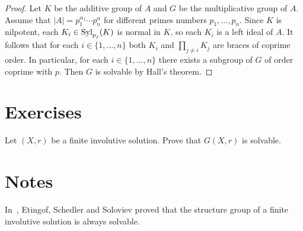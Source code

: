 \begin{proof}
    Let $K$ be the additive group of $A$ and $G$ be the multiplicative group of $A$. Assume
    that $|A|=p_1^{\alpha_1}\cdots p_n^{\alpha}$ for different primes numbers $p_1,\dots,p_n$. 
    Since $K$ is nilpotent, each $K_i\in\mathrm{Syl}_{p_j}(K)$ is normal in $K$, so 
    each $K_i$ is a left ideal of $A$. It follows that for each $i\in\{1,\dots,n\}$ both $K_i$ and 
    $\prod_{j\ne i}K_j$ are braces of coprime order. In particular, for 
    each $i\in\{1,\dots,n\}$ there exists a subgroup of $G$ of order coprime with $p$. 
    Then $G$ is solvable by Hall's theorem. 
\end{proof}








\section*{Exercises}

\begin{prob}
\label{prob:G(X,r)solvable}
Let $(X,r)$ be a finite involutive solution. Prove that $G(X,r)$ is solvable. 
\end{prob}


\section*{Notes}

In~\cite{MR1722951}, Etingof, Schedler and Soloviev proved that the structure group of a finite involutive
solution is always solvable. 

